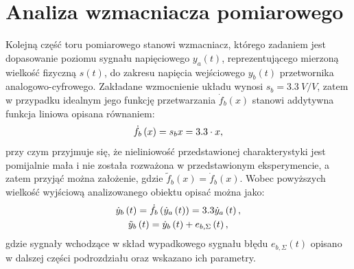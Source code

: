 \section{Analiza wzmacniacza pomiarowego}

Kolejną część toru pomiarowego stanowi wzmacniacz, którego zadaniem jest dopasowanie poziomu sygnału napięciowego $y_{a}(t)$, reprezentującego mierzoną wielkość fizyczną $s(t)$, do zakresu napięcia wejściowego $y_{b}(t)$ przetwornika analogowo-cyfrowego. Zakładane wzmocnienie układu wynosi $s_{b} = \qty{3.3}{V \per V}$, zatem w przypadku idealnym jego funkcję przetwarzania $\dot{f}_{b}(x)$ stanowi addytywna funkcja liniowa opisana równaniem:
\begin{equation}
\dot{f}_{b} \left(x\right) = s_{b} x = 3.3 \cdot x \label{eq:sym_partb_function},
\end{equation}
przy czym przyjmuje się, że nieliniowość przedstawionej charakterystyki jest pomijalnie mała i nie została rozważona w przedstawionym eksperymencie, a zatem przyjąć można założenie, gdzie $\tilde{f}_{b}(x) = \dot{f}_{b}(x)$. Wobec powyższych wielkość wyjściową analizowanego obiektu opisać można jako:
\begin{gather}
\dot{y}_{b} \left(t\right) = \dot{f}_{b} \left(\dot{y}_{a} \left(t\right)\right) = 3.3 \dot{y}_{a} \left(t\right) \label{eq:sym_partb_out_ideal}, \\
\tilde{y}_{b} \left(t\right) = \dot{y}_{b} \left(t\right) + e_{b,\Sigma} \left(t\right) \label{eq:sym_partb_out_real},
\end{gather}
gdzie sygnały wchodzące w skład wypadkowego sygnału błędu $e_{b,\Sigma}(t)$ opisano w dalszej części podrozdziału oraz wskazano ich parametry.

